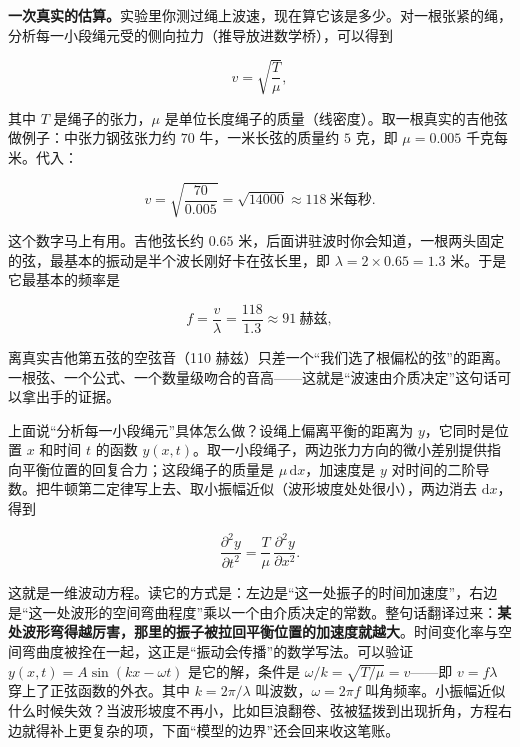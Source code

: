 \begin{mainline}
\textbf{一次真实的估算。}实验里你测过绳上波速，现在算它该是多少。对一根张紧的绳，分析每一小段绳元受的侧向拉力（推导放进数学桥），可以得到

\[
  v = \sqrt{\frac{T}{\mu}},
\]

其中 \(T\) 是绳子的张力，\(\mu\) 是单位长度绳子的质量（线密度）。取一根真实的吉他弦做例子：中张力钢弦张力约 \(70\) 牛，一米长弦的质量约 \(5\) 克，即 \(\mu = 0.005\) 千克每米。代入：

\[
  v = \sqrt{\frac{70}{0.005}} = \sqrt{14000} \approx 118\ \text{米每秒}.
\]

这个数字马上有用。吉他弦长约 \(0.65\) 米，后面讲驻波时你会知道，一根两头固定的弦，最基本的振动是半个波长刚好卡在弦长里，即 \(\lambda = 2\times 0.65 = 1.3\) 米。于是它最基本的频率是

\[
  f = \frac{v}{\lambda} = \frac{118}{1.3} \approx 91\ \text{赫兹},
\]

离真实吉他第五弦的空弦音（110 赫兹）只差一个“我们选了根偏松的弦”的距离。一根弦、一个公式、一个数量级吻合的音高——这就是“波速由介质决定”这句话可以拿出手的证据。
\end{mainline}

\begin{mathbridge}
上面说“分析每一小段绳元”具体怎么做？设绳上偏离平衡的距离为 \(y\)，它同时是位置 \(x\) 和时间 \(t\) 的函数 \(y(x,t)\)。取一小段绳子，两边张力方向的微小差别提供指向平衡位置的回复合力；这段绳子的质量是 \(\mu\,\mathrm{d}x\)，加速度是 \(y\) 对时间的二阶导数。把牛顿第二定律写上去、取小振幅近似（波形坡度处处很小），两边消去 \(\mathrm{d}x\)，得到

\[
  \frac{\partial^2 y}{\partial t^2} = \frac{T}{\mu}\,\frac{\partial^2 y}{\partial x^2}.
\]

这就是一维波动方程。读它的方式是：左边是“这一处振子的时间加速度”，右边是“这一处波形的空间弯曲程度”乘以一个由介质决定的常数。整句话翻译过来：\textbf{某处波形弯得越厉害，那里的振子被拉回平衡位置的加速度就越大}。时间变化率与空间弯曲度被拴在一起，这正是“振动会传播”的数学写法。可以验证 \(y(x,t)=A\sin(kx-\omega t)\) 是它的解，条件是 \(\omega/k=\sqrt{T/\mu}=v\)——即 \(v=f\lambda\) 穿上了正弦函数的外衣。其中 \(k=2\pi/\lambda\) 叫波数，\(\omega=2\pi f\) 叫角频率。小振幅近似什么时候失效？当波形坡度不再小，比如巨浪翻卷、弦被猛拨到出现折角，方程右边就得补上更复杂的项，下面“模型的边界”还会回来收这笔账。
\end{mathbridge}

